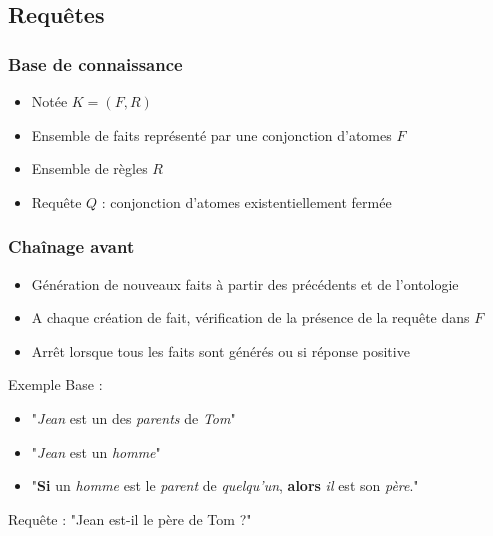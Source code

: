 
\subsection{Requêtes}

\begin{frame}
	\frametitle{Base de connaissance}
	\begin{itemize}
		\item Notée $K = (F,R)$
		\item Ensemble de faits représenté par une conjonction d'atomes $F$
		\item Ensemble de règles $R$
		\item Requête $Q$ : conjonction d'atomes existentiellement fermée
	\end{itemize}
\end{frame}

\begin{frame}
	\frametitle{Chaînage avant}
	\begin{itemize}
		\item Génération de nouveaux faits à partir des précédents et de l'ontologie
		\item A chaque création de fait, vérification de la présence de la requête dans
		$F$
		\item Arrêt lorsque tous les faits sont générés ou si réponse positive
	\end{itemize}
	\begin{exampleblock}{Exemple}
	Base :
	\begin{itemize}
		\item "{\em Jean} est un des {\em parents} de {\em Tom}"
		\item "{\em Jean} est un {\em homme}"
		\item "{\bf Si} un {\em homme} est le {\em parent} de {\em quelqu'un}, {\bf
		alors} {\em il} est son {\em père}."\\
	\end{itemize}
	Requête : "Jean est-il le père de Tom ?"\\
	\end{exampleblock}
\end{frame}


